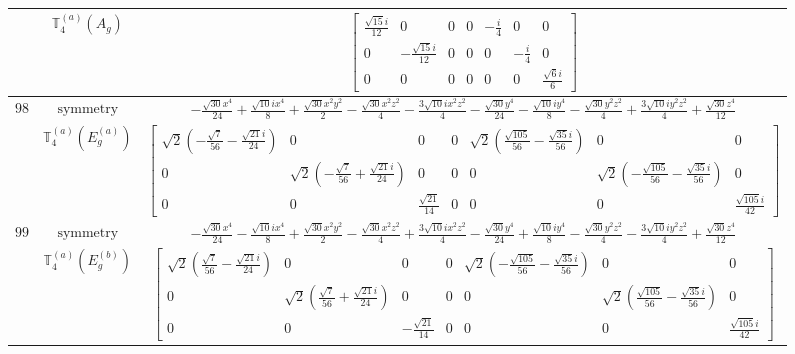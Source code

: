 \documentclass[fleqn,8pt,landscape]{jsarticle}
\begin{document}
\begin{longtable}{ccc}
$  $ & $ \mathbb{T}_{4}^{(a)}(A_{g}) $ & $ \begin{bmatrix} \frac{\sqrt{15} i}{12} & 0 & 0 & 0 & - \frac{i}{4} & 0 & 0 \\ 0 & - \frac{\sqrt{15} i}{12} & 0 & 0 & 0 & - \frac{i}{4} & 0 \\ 0 & 0 & 0 & 0 & 0 & 0 & \frac{\sqrt{6} i}{6} \end{bmatrix} $ \\ \hline
$ 98 $ & $ \text{symmetry} $ & $ - \frac{\sqrt{30} x^{4}}{24} + \frac{\sqrt{10} i x^{4}}{8} + \frac{\sqrt{30} x^{2} y^{2}}{2} - \frac{\sqrt{30} x^{2} z^{2}}{4} - \frac{3 \sqrt{10} i x^{2} z^{2}}{4} - \frac{\sqrt{30} y^{4}}{24} - \frac{\sqrt{10} i y^{4}}{8} - \frac{\sqrt{30} y^{2} z^{2}}{4} + \frac{3 \sqrt{10} i y^{2} z^{2}}{4} + \frac{\sqrt{30} z^{4}}{12} $ \\
$  $ & $ \mathbb{T}_{4}^{(a)}(E_{g}^{(a)}) $ & $ \begin{bmatrix} \sqrt{2} \left(- \frac{\sqrt{7}}{56} - \frac{\sqrt{21} i}{24}\right) & 0 & 0 & 0 & \sqrt{2} \left(\frac{\sqrt{105}}{56} - \frac{\sqrt{35} i}{56}\right) & 0 & 0 \\ 0 & \sqrt{2} \left(- \frac{\sqrt{7}}{56} + \frac{\sqrt{21} i}{24}\right) & 0 & 0 & 0 & \sqrt{2} \left(- \frac{\sqrt{105}}{56} - \frac{\sqrt{35} i}{56}\right) & 0 \\ 0 & 0 & \frac{\sqrt{21}}{14} & 0 & 0 & 0 & \frac{\sqrt{105} i}{42} \end{bmatrix} $ \\ \hline
$ 99 $ & $ \text{symmetry} $ & $ - \frac{\sqrt{30} x^{4}}{24} - \frac{\sqrt{10} i x^{4}}{8} + \frac{\sqrt{30} x^{2} y^{2}}{2} - \frac{\sqrt{30} x^{2} z^{2}}{4} + \frac{3 \sqrt{10} i x^{2} z^{2}}{4} - \frac{\sqrt{30} y^{4}}{24} + \frac{\sqrt{10} i y^{4}}{8} - \frac{\sqrt{30} y^{2} z^{2}}{4} - \frac{3 \sqrt{10} i y^{2} z^{2}}{4} + \frac{\sqrt{30} z^{4}}{12} $ \\
$  $ & $ \mathbb{T}_{4}^{(a)}(E_{g}^{(b)}) $ & $ \begin{bmatrix} \sqrt{2} \left(\frac{\sqrt{7}}{56} - \frac{\sqrt{21} i}{24}\right) & 0 & 0 & 0 & \sqrt{2} \left(- \frac{\sqrt{105}}{56} - \frac{\sqrt{35} i}{56}\right) & 0 & 0 \\ 0 & \sqrt{2} \left(\frac{\sqrt{7}}{56} + \frac{\sqrt{21} i}{24}\right) & 0 & 0 & 0 & \sqrt{2} \left(\frac{\sqrt{105}}{56} - \frac{\sqrt{35} i}{56}\right) & 0 \\ 0 & 0 & - \frac{\sqrt{21}}{14} & 0 & 0 & 0 & \frac{\sqrt{105} i}{42} \end{bmatrix} $ \\ \hline

\end{longtable}
\end{document}
